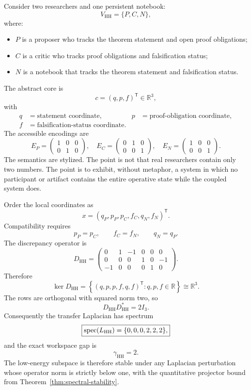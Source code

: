 Consider two researchers and one persistent notebook:
\[
V_{\mathrm{HH}}=\{P,C,N\},
\]
where:
\begin{itemize}
\item \(P\) is a proposer who tracks the theorem statement and open proof
 obligations;
\item \(C\) is a critic who tracks proof obligations and falsification status;
\item \(N\) is a notebook that tracks the theorem statement and falsification
 status.
\end{itemize}
The abstract core is
\[
c=(q,p,f)^{\mathsf T}\in\mathbb R^3,
\]
with
\[
\begin{aligned}
q&=\text{statement coordinate},
&
p&=\text{proof-obligation coordinate},\\
f&=\text{falsification-status coordinate}.
\end{aligned}
\]
The accessible encodings are
\[
E_P=
\begin{pmatrix}
1&0&0\\
0&1&0
\end{pmatrix},
\quad
E_C=
\begin{pmatrix}
0&1&0\\
0&0&1
\end{pmatrix},
\quad
E_N=
\begin{pmatrix}
1&0&0\\
0&0&1
\end{pmatrix}.
\]
The semantics are stylized. The point is not that real researchers contain
only two numbers. The point is to exhibit, without metaphor, a system in which
no participant or artifact contains the entire operative state while the
coupled system does.


Order the local coordinates as
\[
x=(q_P,p_P,p_C,f_C,q_N,f_N)^{\mathsf T}.
\]
Compatibility requires
\[
p_P=p_C,
\qquad
f_C=f_N,
\qquad
q_N=q_P.
\]
The discrepancy operator is
\[
D_{\mathrm{HH}}
=
\begin{pmatrix}
0&1&-1&0&0&0\\
0&0&0&1&0&-1\\
-1&0&0&0&1&0
\end{pmatrix}.
\]
Therefore
\[
\ker D_{\mathrm{HH}}
=
\left\{
(q,p,p,f,q,f)^{\mathsf T}:q,p,f\in\mathbb R
\right\}
\cong\mathbb R^3.
\]
The rows are orthogonal with squared norm two, so
\[
D_{\mathrm{HH}}D_{\mathrm{HH}}^*=2I_3.
\]
Consequently the transfer Laplacian has spectrum
\[
\boxed{
\operatorname{spec}(L_{\mathrm{HH}})
=
\{0,0,0,2,2,2\},
}
\]
and the exact workspace gap is
\[
\gamma_{\mathrm{HH}}=2.
\]
The low-energy subspace is therefore stable under any Laplacian perturbation
whose operator norm is strictly below one, with the quantitative projector
bound from Theorem~\ref{thm:spectral-stability}.

